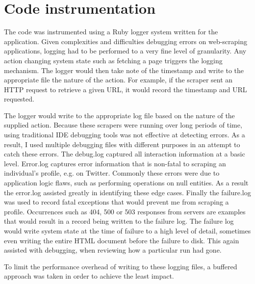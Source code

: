 


\section{Code instrumentation}

The code was instrumented using a Ruby logger system written for the application. Given complexities and difficulties debugging errors on web-scraping applications, logging had to be performed to a very fine level of granularity. Any action changing system state such as fetching a page triggers the logging mechanism. The logger would then take note of the timestamp and write to the appropriate file the nature of the action. For example, if the scraper sent an HTTP request to retrieve a given URL, it would record the timestamp and URL requested. 

The logger would write to the appropriate log file based on the nature of the supplied action. Because these scrapers were running over long periods of time, using traditional IDE debugging tools was not effective at detecting errors. As a result, I used multiple debugging files with different purposes in an attempt to catch these errors. The debug.log captured all interaction information at a basic level. Error.log captures error information that is non-fatal to scraping an individual's profile, e.g. on Twitter. Commonly these errors were due to application logic flaws, such as performing operations on null entities. As a result the error.log assisted greatly in identifying these edge cases. Finally the failure.log was used to record fatal exceptions that would prevent me from scraping a profile. Occurrences such as 404, 500 or 503 responses from servers are examples that would result in a record being written to the failure log. The failure log would write system state at the time of failure to a high 
level 
of detail, sometimes even writing the entire HTML document before the failure to disk. This again assisted with debugging, when reviewing how a particular run had gone. 

To limit the performance overhead of writing to these logging files, a buffered approach was taken in order to achieve the least impact. %
